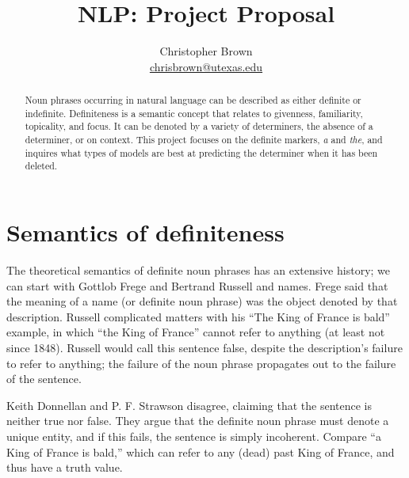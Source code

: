 \documentclass[11pt]{article}
\title{NLP: Project Proposal}
\author{Christopher Brown\smallskip\\\href{mailto:chrisbrown@utexas.edu}{chrisbrown@utexas.edu}}
\begin{document}
\maketitle

\begin{abstract}
\noindent
Noun phrases occurring in natural language can be described as either definite or indefinite.
Definiteness is a semantic concept that relates to givenness, familiarity, topicality, and focus.
It can be denoted by a variety of determiners, the absence of a determiner, or on context.
This project focuses on the definite markers, \emph{a} and \emph{the}, and inquires what types of models are best at predicting the determiner when it has been deleted.
\end{abstract}

\section{Semantics of definiteness}
The theoretical semantics of definite noun phrases has an extensive history; we can start with Gottlob Frege and Bertrand Russell and names. Frege said that the meaning of a name (or definite noun phrase) was the object denoted by that description. Russell complicated matters with his ``The King of France is bald'' example, in which ``the King of France'' cannot refer to anything (at least not since 1848). Russell would call this sentence false, despite the description's failure to refer to anything; the failure of the noun phrase propagates out to the failure of the sentence.

Keith Donnellan and P. F. Strawson disagree, claiming that the sentence is neither true nor false. They argue that the definite noun phrase must denote a unique entity, and if this fails, the sentence is simply incoherent.
Compare ``a King of France is bald,'' which can refer to any (dead) past King of France, and thus have a truth value.
\end{document}
